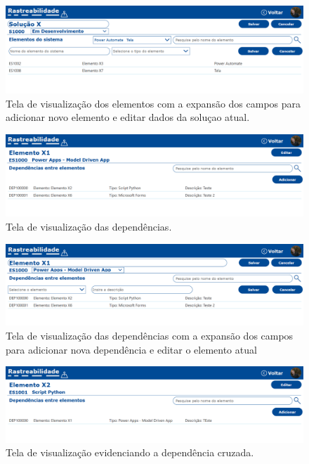 	\begin{figure}[!h]
		\centering
		\includegraphics[width=1\textwidth]{./figuras/solucaoElementosAdd.png}
		\caption{Tela de visualização dos elementos com a expansão dos campos para adicionar novo elemento e editar dados da soluçao atual.}
		\label{fig:resultados:solucaoElementosAdd}
	\end{figure}

	\begin{figure}[!h]
		\centering
		\includegraphics[width=1\textwidth]{./figuras/elementoDependencias.png}
		\caption{Tela de visualização das dependências.}
		\label{fig:resultados:elementoDependencias}
	\end{figure}

	\begin{figure}[!h]
		\centering
		\includegraphics[width=1\textwidth]{./figuras/elementoDependenciasAdd.png}
		\caption{Tela de visualização das dependências com a expansão dos campos para adicionar nova dependência e editar o elemento atual}
		\label{fig:resultados:elementoDependenciasAdd}
	\end{figure}

	\begin{figure}[!h]
		\centering
		\includegraphics[width=1\textwidth]{./figuras/dependenciaCruzada.png}
		\caption{Tela de visualização evidenciando a dependência cruzada.}
		\label{fig:resultados:dependenciaCruzada}
	\end{figure}


